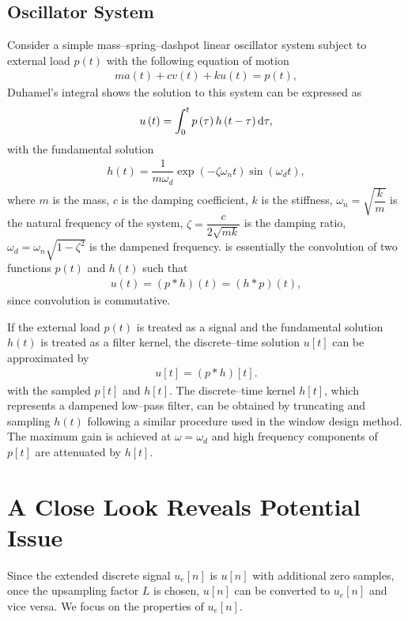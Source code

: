 \subsection{Oscillator System}
Consider a simple mass--spring--dashpot linear oscillator system subject to external load $p\left(t\right)$ with the following equation of motion
\begin{gather}
ma\left(t\right)+cv\left(t\right)+ku\left(t\right)=p\left(t\right),
\end{gather}
Duhamel's integral shows the solution to this system can be expressed as
\begin{gather}\label{eq:duhamel}
u\left(t\right)=\int_{0}^{t}p\left(\tau\right)h\left(t-\tau\right)\mathrm{d}\tau,
\end{gather}
with the fundamental solution
\begin{gather}
h\left(t\right)=\dfrac{1}{m\omega_d}\exp\left(-\zeta\omega_nt\right)\sin\left(\omega_dt\right),
\end{gather}
where $m$ is the mass, $c$ is the damping coefficient, $k$ is the stiffness, $\omega_n=\sqrt{\dfrac{k}{m}}$ is the natural frequency of the system, $\zeta=\dfrac{c}{2\sqrt{mk}}$ is the damping ratio, $\omega_d=\omega_n\sqrt{1-\zeta^2}$ is the dampened frequency.  is essentially the convolution of two functions $p\left(t\right)$ and $h\left(t\right)$ such that
\begin{gather}
u\left(t\right)=\left(p\ast{}h\right)\left(t\right)=\left(h\ast{}p\right)\left(t\right),
\end{gather}
since convolution is commutative.

If the external load $p\left(t\right)$ is treated as a signal and the fundamental solution $h\left(t\right)$ is treated as a filter kernel, the discrete--time solution $u[t]$ can be approximated by
\begin{gather}
u[t]=\left(p\ast{}h\right)[t].
\end{gather}
with the sampled $p[t]$ and $h[t]$. The discrete--time kernel $h[t]$, which represents a dampened low--pass filter, can be obtained by truncating and sampling $h\left(t\right)$ following a similar procedure used in the window design method. The maximum gain is achieved at $\omega=\omega_d$ and high frequency components of $p[t]$ are attenuated by $h[t]$.
\section{A Close Look Reveals Potential Issue}
Since the extended discrete signal $u_e[n]$ is $u[n]$ with additional zero samples, once the upsampling factor $L$ is chosen, $u[n]$ can be converted to $u_e[n]$ and vice versa. We focus on the properties of $u_e[n]$.

